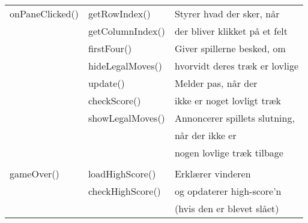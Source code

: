 \begin{table}[H]
\begin{tabular}{lll}
onPaneClicked() & getRowIndex() & Styrer hvad der sker, når \\ 
& getColumnIndex() & der bliver klikket på et felt\\
&  firstFour() & Giver spillerne besked, om \\
& hideLegalMoves() &hvorvidt deres træk er lovlige\\
& update() & Melder pas, når der \\ 
& checkScore() & ikke er noget lovligt træk\\
& showLegalMoves() & Annoncerer spillets slutning,\\ 
&& når der ikke er \\
&& nogen lovlige træk tilbage\\
& \\

gameOver() & loadHighScore() & Erklærer vinderen\\
& checkHighScore() & og opdaterer high-score'n\\
&& (hvis den er blevet slået) \\


\bottomrule
\end{tabular}
\end{table}

